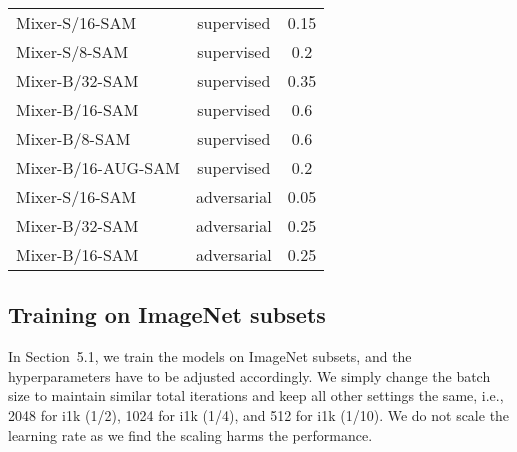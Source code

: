 \begin{table}
{\begin{tabular}{l|cc}
    Mixer-S/16-SAM & supervised & 0.15 \\
    Mixer-S/8-SAM & supervised & 0.2 \\
    Mixer-B/32-SAM & supervised & 0.35 \\
    Mixer-B/16-SAM & supervised & 0.6 \\
    Mixer-B/8-SAM & supervised & 0.6 \\
    Mixer-B/16-AUG-SAM & supervised & 0.2 \\
    Mixer-S/16-SAM & adversarial & 0.05 \\
    Mixer-B/32-SAM & adversarial & 0.25 \\
    Mixer-B/16-SAM & adversarial & 0.25 \\
    \bottomrule
    
    \end{tabular}}
\end{table}



\begin{table}
    \caption{ImageNet top-1 accuracy (\%) of ViT-B/16 and Mixer-B/16 when trained from scratch with different perturbation strength $\rho$ in SAM.
    }
    \label{tab:rho-vary}
    \centering
\end{table}




\subsection{Training on ImageNet subsets}
In Section~5.1, we train the models on ImageNet subsets, and the hyperparameters have to be adjusted accordingly.
We simply change the batch size to maintain similar total iterations and keep all other settings the same, i.e., 2048 for i1k (1/2), 1024 for i1k (1/4), and 512 for i1k (1/10).
We do not scale the learning rate as we find the scaling harms the performance.


